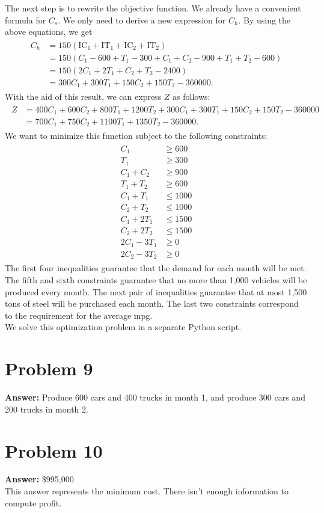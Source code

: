 \documentclass[11pt]{article}
\begin{document}
The next step is to rewrite the objective function. We already have a convenient
formula for \(C_s\). We only need to derive a new expression for \(C_h\). By
using the above equations, we get
\begin{align}
  \begin{split}
    C_h&=150(\mathrm{IC}_1+\mathrm{IT}_1+\mathrm{IC}_2+\mathrm{IT}_2)\\
    &=150(C_1-600+T_1-300+C_1+C_2-900+T_1+T_2-600)\\
    &=150(2C_1+2T_1+C_2+T_2-2400)\\
    &=300C_1+300T_1+150C_2+150T_2-360000.
  \end{split}
\end{align}
With the aid of this result, we can express \(Z\) as follows:
\begin{align}
  \begin{split}
    Z&=400C_1+600C_2+800T_1+1200T_2+300C_1+300T_1+150C_2+150T_2-360000\\
    &=700C_1+750C_2+1100T_1+1350T_2-360000.
  \end{split}
\end{align}
We want to minimize this function subject to the following constraints:
\begin{align}
  \begin{split}
    C_1&\geq 600\\
    T_1&\geq 300\\
    C_1+C_2&\geq 900\\
    T_1+T_2&\geq 600\\
    C_1+T_1&\leq 1000\\
    C_2+T_2&\leq 1000\\
    C_1+2T_1&\leq 1500\\
    C_2+2T_2&\leq 1500\\
    2C_1-3T_1&\geq 0\\
    2C_2-3T_2&\geq 0
  \end{split}
\end{align}
The first four inequalities guarantee that the demand for each month will be
met. The fifth and sixth constraints guarantee that no more than 1,000 vehicles
will be produced every month. The next pair of inequalities guarantee that at
most 1,500 tons of steel will be purchased each month. The last two constraints
correspond to the requirement for the average mpg.\\
We solve this optimization problem in a separate Python script.
\section*{Problem 9}
\label{sec:org1c82937}

\textbf{Answer:} Produce 600 cars and 400 trucks in month 1, and produce 300 cars and
200 trucks in month 2.
\section*{Problem 10}
\label{sec:orgacf3879}

\textbf{Answer:} \$995,000\\

This answer represents the minimum cost. There isn't enough information to
compute profit.
\end{document}
